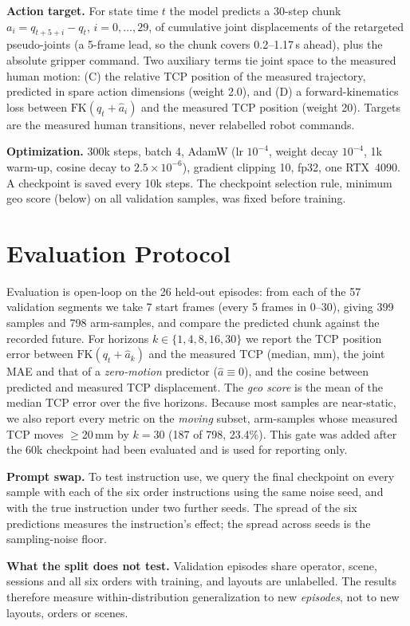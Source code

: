 \documentclass[conference,10pt]{IEEEtran}
\newcommand{\mm}{\,mm\xspace}
\begin{document}
\textbf{Action target.} For state time $t$ the model predicts a 30-step chunk $a_i = q_{t+5+i}-q_t$, $i=0,\dots,29$, of
cumulative joint displacements of the retargeted pseudo-joints (a 5-frame lead, so the chunk covers 0.2--1.17\,s ahead), plus
the absolute gripper command. Two auxiliary terms tie joint space to the measured human motion: (C) the relative TCP position
of the measured trajectory, predicted in spare action dimensions (weight 2.0), and (D) a forward-kinematics loss between
$\mathrm{FK}(q_t+\hat a_i)$ and the measured TCP position (weight 20). Targets are the measured human transitions, never
relabelled robot commands.

\textbf{Optimization.} 300k steps, batch 4, AdamW (lr $10^{-4}$, weight decay $10^{-4}$, 1k warm-up, cosine decay to
$2.5\times10^{-6}$), gradient clipping 10, fp32, one RTX~4090. A checkpoint is saved every 10k steps.
The checkpoint selection rule, minimum geo score (below) on all validation samples, was fixed before training.

\section{Evaluation Protocol}\label{sec:eval}
Evaluation is open-loop on the 26 held-out episodes: from each of the 57 validation segments we take 7 start frames (every 5
frames in 0--30), giving 399 samples and 798 arm-samples, and compare the predicted chunk against the recorded future.
For horizons $k\in\{1,4,8,16,30\}$ we report the TCP position error between $\mathrm{FK}(q_t+\hat a_k)$ and the measured TCP
(median, mm), the joint MAE and that of a \emph{zero-motion} predictor ($\hat a\equiv0$), and the cosine between predicted and
measured TCP displacement. The \emph{geo score} is the mean of the median TCP error over the five horizons. Because most samples
are near-static, we also report every metric on the \emph{moving} subset, arm-samples whose measured TCP moves $\ge$20\mm by $k{=}30$
(187 of 798, 23.4\%). This gate was added after the 60k checkpoint had been evaluated and is used for reporting only.

\textbf{Prompt swap.} To test instruction use, we query the final checkpoint on every sample with each of the six order
instructions using the same noise seed, and with the true instruction under two further seeds. The spread of the six
predictions measures the instruction's effect; the spread across seeds is the sampling-noise floor.

\textbf{What the split does not test.} Validation episodes share operator, scene, sessions and all six orders with training,
and layouts are unlabelled. The results therefore measure within-distribution generalization to new \emph{episodes}, not to new
layouts, orders or scenes.
\end{document}
